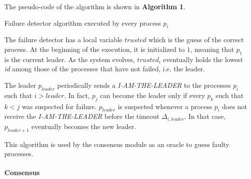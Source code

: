 \documentclass[a4paper]{article}
\begin{document}
The pseudo-code of the algorithm is shown in \textbf{Algorithm 1}.

\begin{algorithm}[H]

 \caption{Failure detector algorithm executed by every process $p_i$}
\end{algorithm}
The failure detector has a local variable $trusted$ which is the guess of the correct process. At the beginning of the execution, it is initialized to $1$, meaning that $p_1$ is the current leader.
As the system evolves, $trusted_i$ eventually holds the lowest \emph{id} among those of the processes that have not failed, i.e. the leader.

The leader $p_{leader}$ periodically sends a \emph{I-AM-THE-LEADER} to the processes $p_i$ such that $i > leader$. In fact, $p_j$ can become the leader only if every $p_k$ such that $k < j$ was suspected for failure. $p_{leader}$ is suspected whenever a process $p_i$ does not receive the \emph{I-AM-THE-LEADER} before the timeout $\Delta_{i, leader}$. In that case, $p_{leader + 1}$ eventually becomes the new leader.

This algorithm is used by the consensus module as an oracle to guess faulty processes.

\paragraph{Consensus}
\end{document}
